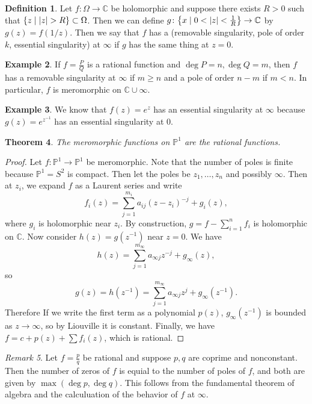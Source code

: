 \documentclass[leqno, openany]{memoir}
\newtheorem{thm}{Theorem}[section]
\theoremstyle{definition}
\newtheorem{defn}[thm]{Definition}
\newtheorem{exm}[thm]{Example}
\theoremstyle{remark}
\newtheorem{rmk}[thm]{Remark}
\theoremstyle{plain}
\theoremstyle{definition}
\theoremstyle{remark}
\newcommand{\C}{\mathbb{C}}
\renewcommand{\P}{\mathbb{P}}
\begin{document}
\begin{defn}
    Let $f \colon \Omega \to \C$ be holomorphic and suppose there exists $R > 0$ such that $\qty{z \mid \abs{z} > R} \subset \Omega$. Then we can define $g \colon \qty{x \mid 0 < \abs{z} < \frac{1}{R}} \to \C$ by $g(z) = f(1/z)$. Then we say that $f$ has a (removable singularity, pole of order $k$, essential singularity) at $\infty$ if $g$ has the same thing at $z = 0$.
\end{defn}

\begin{exm}
    If $f = \frac{P}{Q}$ is a rational function and $\deg P = n, \deg Q = m$, then $f$ has a removable singularity at $\infty$ if $m \geq n$ and a pole of order $n-m$ if $m < n$. In particular, $f$ is meromorphic on $\C \cup \infty$.
\end{exm}

\begin{exm}
    We know that $f(z) = e^{z}$ has an essential singularity at $\infty$ because $g(z) = e^{z^{-1}}$ has an essential singularity at $0$.
\end{exm}

\begin{thm}
    The meromorphic functions on $\P^1$ are the rational functions.
\end{thm}

\begin{proof}
    Let $f \colon \P^1 \to \P^1$ be meromorphic. Note that the number of poles is finite because $\P^1 = S^2$ is compact. Then let the poles be $z_1, \ldots, z_n$ and possibly $\infty$. Then at $z_i$, we expand $f$ as a Laurent series and write
    \[ f_i(z) = \sum_{j=1}^{m_i} a_{ij} {(z-z_i)}^{-j} + g_i(z), \]
    where $g_i$ is holomorphic near $z_i$. By construction, $g = f - \sum_{i=1}^n f_i$ is holomorphic on $\C$. Now consider $h(z) = g(z^{-1})$ near $z = 0$. We have 
    \[ h(z) = \sum_{j=1}^{m_{\infty}} a_{\infty j} z^{-j} + g_{\infty}(z), \]
    so 
    \[g(z) = h(z^{-1}) = \sum_{j=1}^{m_{\infty}} a_{\infty j} z^j + g_{\infty}(z^{-1}). \]
    Therefore If we write the first term as a polynomial $p(z)$, $g_{\infty}(z^{-1})$ is bounded as $z \to \infty$, so by Liouville it is constant. Finally, we have $f = c + p(z) + \sum f_i(z)$, which is rational.
\end{proof}

\begin{rmk}
    Let $f = \frac{p}{q}$ be rational and suppose $p,q$ are coprime and nonconstant. Then the number of zeros of $f$ is equial to the number of poles of $f$, and both are given by $\max (\deg p, \deg q)$. This follows from the fundamental theorem of algebra and the calculuation of the behavior of $f$ at $\infty$.
\end{rmk}
\end{document}
